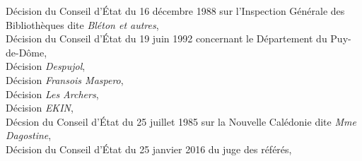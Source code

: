 \documentclass[math]{cours}
\begin{document}
\begin{thebibliography}{255}
		\url{}
		Décision du Conseil d'État du 16 décembre 1988 sur l'Inspection Générale des Bibliothèques dite \emph{Bléton et autres},\\
		\url{}
		Décision du Conseil d'État du 19 juin 1992 concernant le Département du Puy-de-Dôme,\\
		\url{}
		Décision \emph{Despujol},\\
		\url{}
		Décision \emph{Fransois Maspero},\\
		\url{}
		Décision \emph{Les Archers},\\
		\url{}
		Décision \emph{EKIN},\\
		\url{}
		Décsion du Conseil d'État du 25 juillet 1985 sur la Nouvelle Calédonie dite \emph{Mme Dagostine},\\
		\url{}
		Décision du Conseil d'État du 25 janvier 2016 du juge des référés,\\
		\url{}
\end{thebibliography}
\newpage
{}

\end{document}
